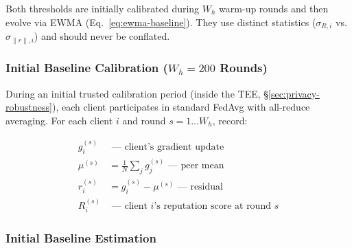 \documentclass[10pt,journal]{IEEEtran}
\begin{document}
\begin{table}[t]
\centering
\caption{Dual-threshold architecture for per-client detection.}
\label{tab:dual-threshold}
\footnotesize
{}
\end{table}

Both thresholds are initially calibrated during $W_h$ warm-up rounds and then evolve via EWMA (Eq.~\ref{eq:ewma-baseline}). They use distinct statistics ($\sigma_{R,i}$ vs. $\sigma_{\|r\|,i}$) and should never be conflated.

\subsubsection{Initial Baseline Calibration ($W_h = 200$ Rounds)}\label{sec:warmup-calibration}

During an initial trusted calibration period (inside the TEE, \S\ref{sec:privacy-robustness}), each client participates in standard FedAvg with all-reduce averaging. For each client $i$ and round $s = 1 \ldots W_h$, record:

\begin{align}
g_i^{(s)} &\text{ --- client's gradient update} \nonumber\\
\mu^{(s)} &= \textstyle\frac{1}{N} \sum_j g_j^{(s)} \text{ --- peer mean} \nonumber\\
r_i^{(s)} &= g_i^{(s)} - \mu^{(s)} \text{ --- residual} \nonumber\\
R_i^{(s)} &\text{ --- client $i$'s reputation score at round $s$} \nonumber
\end{align}

\subsubsection{Initial Baseline Estimation}\label{sec:baseline-estimation}
\end{document}
